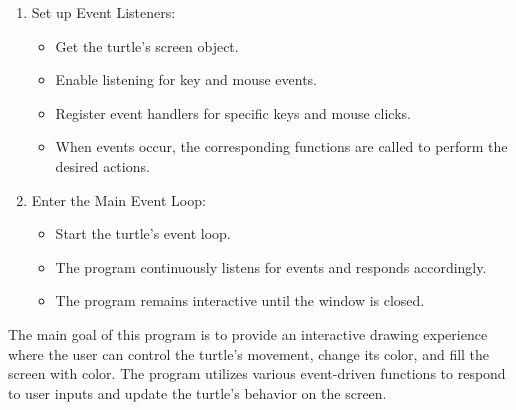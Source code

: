 \documentclass[12pt]{article}
\begin{document}
\begin{enumerate}[label=\arabic*.]
  \item Set up Event Listeners:
    \begin{itemize}
      \item Get the turtle's screen object.
      \item Enable listening for key and mouse events.
      \item Register event handlers for specific keys and mouse clicks.
      \item When events occur, the corresponding functions are called to perform the desired actions.
    \end{itemize}
  
  \item Enter the Main Event Loop:
    \begin{itemize}
      \item Start the turtle's event loop.
      \item The program continuously listens for events and responds accordingly.
      \item The program remains interactive until the window is closed.
    \end{itemize}
\end{enumerate}

The main goal of this program is to provide an interactive drawing experience where the user can control the turtle's movement, change its color, and fill the screen with color. The program utilizes various event-driven functions to respond to user inputs and update the turtle's behavior on the screen.
\end{document}
